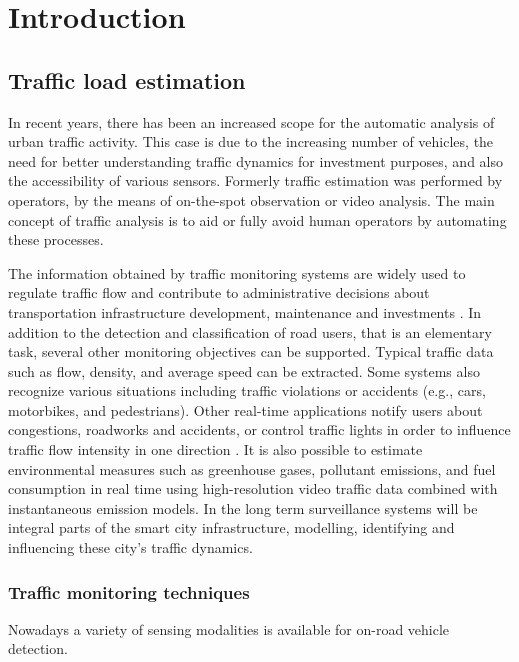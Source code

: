 \renewcommand{\thechapter}{\Alph{chapter}}
\chapter*{Introduction}\label{chap:introduction}\setcounter{chapter}{9} 
\section{Traffic load estimation}
In recent years, there has been an increased scope for the automatic analysis of urban traffic activity\cite{Buch2011}.
This case is due to the increasing number of vehicles, the need for better understanding traffic dynamics for investment purposes, and also the accessibility of various sensors.
Formerly traffic estimation was performed by operators, by the means of on-the-spot observation or video analysis.
The main concept of traffic analysis is to aid or fully avoid human operators by automating these processes.

The information obtained by traffic monitoring systems are widely used to regulate traffic flow and contribute to administrative decisions about transportation infrastructure development, maintenance and investments \cite{MagyarKozut}.
In addition to the detection and classification of road users, that is an elementary task, several other monitoring objectives can be supported. 
Typical traffic data such as flow, density, and average speed can be extracted.
Some systems also recognize various situations including traffic violations or accidents (e.g., cars, motorbikes, and pedestrians).
Other real-time applications notify users about congestions, roadworks and accidents, or control traffic lights in order to influence traffic flow intensity in one direction \cite{AzoSensor, Thiruverahan2015, Ghazal2016}.
It is also possible to estimate environmental measures such as greenhouse gases, pollutant emissions, and fuel consumption in real time using high-resolution video traffic data combined with instantaneous emission models\cite{Morris2012a}. 
In the long term surveillance systems will be integral parts of the smart city infrastructure, modelling, identifying and influencing these city's traffic dynamics\cite{SOLSUN}.

\subsection{Traffic monitoring techniques}
Nowadays a variety of sensing modalities is available for on-road vehicle detection.


